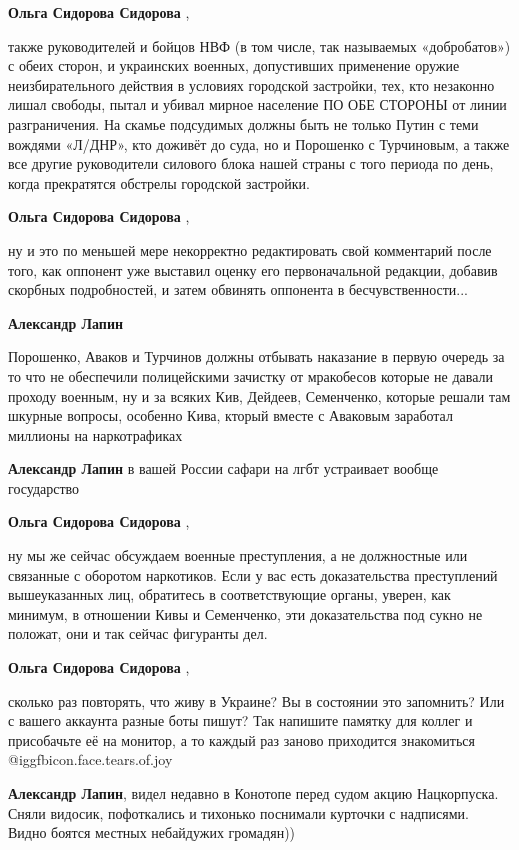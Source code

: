 \begin{itemize}
\begin{itemize}
\textbf{Ольга Сидорова Сидорова} , 

также руководителей и бойцов НВФ (в том числе, так называемых «добробатов») с
обеих сторон, и украинских военных, допустивших применение оружие
неизбирательного действия в условиях городской застройки, тех, кто незаконно
лишал свободы, пытал и убивал мирное население ПО ОБЕ СТОРОНЫ от линии
разграничения. На скамье подсудимых должны быть не только Путин с теми вождями
«Л/ДНР», кто доживёт до суда, но и Порошенко с Турчиновым, а также все другие
руководители силового блока нашей страны с того периода по день, когда
прекратятся обстрелы городской застройки.

\textbf{Ольга Сидорова Сидорова} , 

ну и это по меньшей мере некорректно редактировать свой комментарий после того,
как оппонент уже выставил оценку его первоначальной редакции, добавив скорбных
подробностей, и затем обвинять оппонента в бесчувственности...

\textbf{Александр Лапин} 

Порошенко, Аваков и Турчинов должны отбывать наказание в первую очередь за то
что не обеспечили полицейскими зачистку от мракобесов которые не давали проходу
военным, ну и за всяких Кив, Дейдеев, Семенченко, которые решали там шкурные
вопросы, особенно Кива, кторый вместе с Аваковым заработал миллионы на
наркотрафиках

\textbf{Александр Лапин} в вашей России сафари на лгбт устраивает вообще государство

\textbf{Ольга Сидорова Сидорова} , 

ну мы же сейчас обсуждаем военные преступления, а не должностные или связанные
с оборотом наркотиков. Если у вас есть доказательства преступлений
вышеуказанных лиц, обратитесь в соответствующие органы, уверен, как минимум, в
отношении Кивы и Семенченко, эти доказательства под сукно не положат, они и так
сейчас фигуранты дел.

\textbf{Ольга Сидорова Сидорова} , 

сколько раз повторять, что живу в Украине? Вы в состоянии это запомнить? Или с
вашего аккаунта разные боты пишут? Так напишите памятку для коллег и
присобачьте её на монитор, а то каждый раз заново приходится знакомиться  @igg{fbicon.face.tears.of.joy} 


\textbf{Александр Лапин}, видел недавно в Конотопе перед судом акцию Нацкорпуска. Сняли видосик, пофоткались и тихонько поснимали курточки с надписями.
Видно боятся местных небайдужих громадян))


\end{itemize}
\end{itemize}
